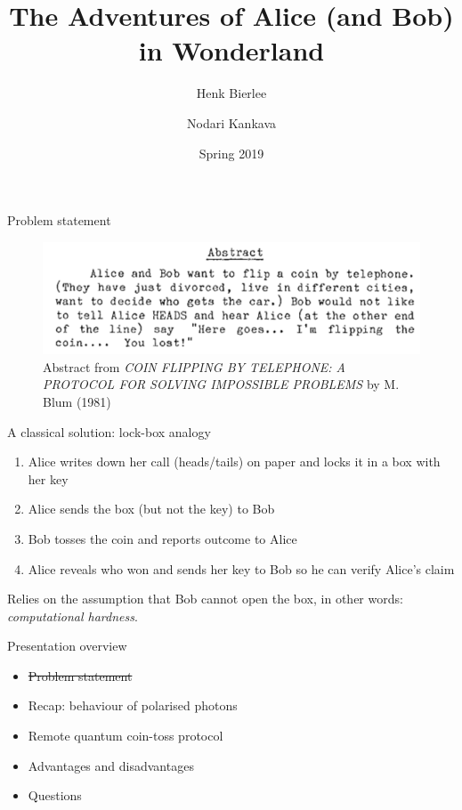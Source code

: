 \documentclass{beamer}
\title{The Adventures of Alice (and Bob) in Wonderland}
\author{Henk Bierlee \and Nodari Kankava}
\institute{Uppsala University}
\date{Spring 2019}
\begin{document}



 
\frame{\titlepage}
 
\begin{frame}{Problem statement}

\begin{figure}
    \centering
    \includegraphics{blum-abstract}
    \caption{Abstract from \emph{COIN FLIPPING BY TELEPHONE: A PROTOCOL FOR SOLVING IMPOSSIBLE PROBLEMS} by M. Blum (1981)}
    \label{fig:blum-abstract}
\end{figure}

\end{frame}

\begin{frame}{A classical solution: lock-box analogy}

\begin{enumerate}
    \item Alice writes down her call (heads/tails) on paper and locks it in a box with her key
    \item Alice sends the box (but not the key) to Bob
    \item Bob tosses the coin and reports outcome to Alice
    \item Alice reveals who won and sends her key to Bob so he can verify Alice's claim
\end{enumerate}

Relies on the assumption that Bob cannot open the box, in other words: \emph{computational hardness}.


\end{frame}

\begin{frame}{Presentation overview}

\begin{itemize}
    \item \sout{Problem statement}
    \vfill
    \item Recap: behaviour of polarised photons
    \vfill
    \item Remote quantum coin-toss protocol
    \vfill
    \item Advantages and disadvantages
    \vfill
    \item Questions
    \vfill
\end{itemize}

\end{frame}
\end{document}
